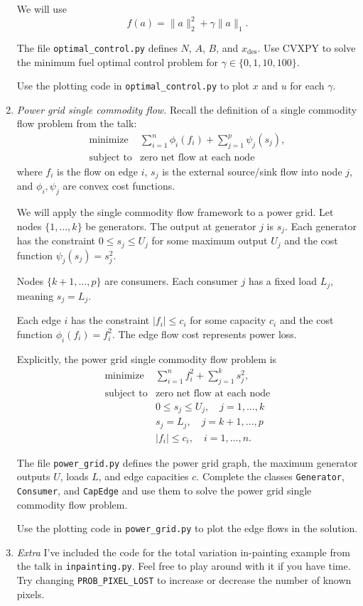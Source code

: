 \documentclass[12pt]{article}
\begin{document}
\begin{enumerate}
We will use
\[
f(a) = \|a\|^2_2 + \gamma\|a\|_1.
\]

The file \verb+optimal_control.py+ defines $N$, $A$, $B$, and $x_\mathrm{des}$. Use CVXPY to solve the minimum fuel optimal control problem for $\gamma \in \{0,1,10,100\}$.

Use the plotting code in \verb+optimal_control.py+ to plot $x$ and $u$ for each $\gamma$.

\item\emph{Power grid single commodity flow.}
Recall the definition of a single commodity flow problem from the talk:
\[
\begin{array}{ll} \mbox{minimize} & \sum_{i=1}^n\phi_{i}(f_{i}) + \sum_{j=1}^p\psi_j(s_j), \\
\mbox{subject to} & \text{zero net flow at each node}
\end{array}
\]
where $f_i$ is the flow on edge $i$, $s_j$ is the external source/sink flow into node $j$, and $\phi_i,\psi_j$ are convex cost functions.

We will apply the single commodity flow framework to a power grid. Let nodes $\{1,\ldots,k\}$ be generators. The output at generator $j$ is $s_j$. Each generator has the constraint $0 \leq s_j \leq U_j$ for some maximum output $U_j$ and the cost function $\psi_j(s_j) = s_j^2$.

Nodes $\{k+1,\ldots,p\}$ are consumers. Each consumer $j$ has a fixed load $L_j$, meaning $s_j = L_j$.

Each edge $i$ has the constraint $|f_i| \leq c_i$ for some capacity $c_i$ and the cost function $\phi_i(f_i) = f_i^2$. The edge flow cost represents power loss.

Explicitly, the power grid single commodity flow problem is
\[
\begin{array}{ll} \mbox{minimize} & \sum_{i=1}^nf_{i}^2 + \sum_{j=1}^k s_j^2, \\
\mbox{subject to} & \text{zero net flow at each node} \\
& 0 \leq s_j \leq U_j, \quad j = 1, \ldots, k \\
& s_j = L_j, \quad j = k+1, \ldots, p \\
& |f_i| \leq c_i, \quad i = 1, \ldots, n.
\end{array}
\]

The file \verb+power_grid.py+ defines the power grid graph, the maximum generator outputs $U$, loads $L$, and edge capacities $c$. Complete the classes \verb+Generator+, \verb+Consumer+, and \verb+CapEdge+ and use them to solve the power grid single commodity flow problem.

Use the plotting code in \verb+power_grid.py+ to plot the edge flows in the solution.

\item\emph{Extra} I've included the code for the total variation in-painting example from the talk in \verb+inpainting.py+. Feel free to play around with it if you have time. Try changing \verb+PROB_PIXEL_LOST+ to increase or decrease the number of known pixels.

\end{enumerate}
\end{document}
